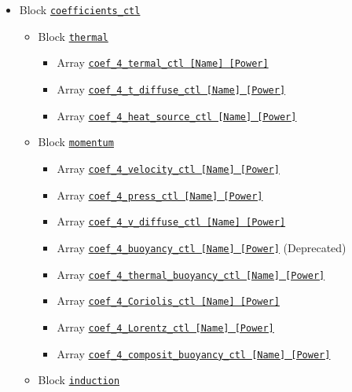 \begin{itemize}
\begin{itemize}
\begin{itemize}
		\end{itemize}
%
	\item Block \hyperref[href_t:coefficients_ctl]{\tt coefficients\_ctl}
		\begin{itemize} \label{href_i:coefficients_ctl}
		\item Block \hyperref[href_t:thermal]{\tt thermal}
			\begin{itemize} \label{href_i:thermal}
			\item Array \hyperref[href_t:coef_4_termal_ctl]
					{\tt coef\_4\_termal\_ctl          [Name] [Power]}
			\item Array \hyperref[href_t:coef_4_t_diffuse_ctl]
					{\tt coef\_4\_t\_diffuse\_ctl      [Name] [Power]}
			\item Array \hyperref[href_t:coef_4_heat_source_ctl]
					{\tt coef\_4\_heat\_source\_ctl    [Name] [Power]}
			\end{itemize}
%
		\item Block \hyperref[href_t:momentum]{\tt momentum}
			\begin{itemize} \label{href_i:momentum}
			\item Array \hyperref[href_t:coef_4_velocity_ctl]
				{\tt coef\_4\_velocity\_ctl          [Name] [Power]}
			\item Array \hyperref[href_t:coef_4_press_ctl]
				{\tt coef\_4\_press\_ctl             [Name] [Power]}
			\item Array \hyperref[href_t:coef_4_v_diffuse_ctl]
				{\tt coef\_4\_v\_diffuse\_ctl         [Name] [Power]}
			\item Array \hyperref[href_t:coef_4_thermal_buoyancy_ctl]
				{\tt coef\_4\_buoyancy\_ctl [Name] [Power]}
				{\color{red} (Deprecated)}
			\item Array \hyperref[href_t:coef_4_thermal_buoyancy_ctl]
				{\tt coef\_4\_thermal\_buoyancy\_ctl [Name] [Power]}
			\item Array \hyperref[href_t:coef_4_Coriolis_ctl]
				{\tt coef\_4\_Coriolis\_ctl          [Name] [Power]}
			\item Array \hyperref[href_t:coef_4_Lorentz_ctl]
				{\tt coef\_4\_Lorentz\_ctl           [Name] [Power]}
			\item Array \hyperref[href_t:coef_4_composit_buoyancy_ctl]
				{\tt coef\_4\_composit\_buoyancy\_ctl [Name] [Power]}
			\end{itemize}
%
		\item Block \hyperref[href_t:induction]{\tt induction}
			\begin{itemize} \label{href_i:induction}

\end{itemize}
\end{itemize}
\end{itemize}
\end{itemize}
